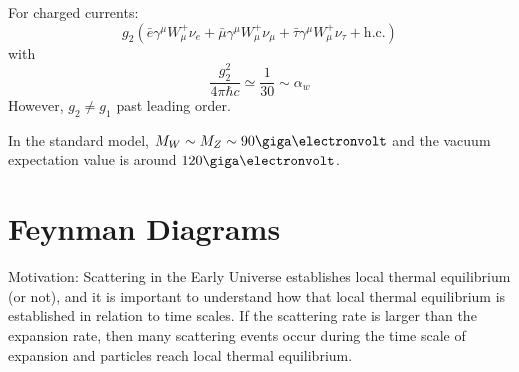 \documentclass[a4paper,twoside,master.tex]{subfiles}
\begin{document}
For charged currents:
\begin{equation}
    g_2 \left( \bar{e} \gamma^{\mu} W_{\mu}^+ \nu_{e} + \bar{\mu} \gamma^{\mu} W_{\mu}^+ \nu_{\mu} + \bar{\tau} \gamma^{\mu} W_{\mu}^+ \nu_{\tau}  + \text{h.c.}\right)
\end{equation}
with
\begin{equation}
    \frac{g_2^2}{4 \pi \hbar c} \simeq \frac{1}{30} \sim \alpha_w
\end{equation}
However, $ g_2 \neq g_1 $ past leading order.

In the standard model, $ M_W \sim M_Z \sim 90\giga\electronvolt $ and the vacuum expectation value is around $ 120\giga\electronvolt $.

\section{Feynman Diagrams}\label{sec:feynman_diagrams}

Motivation: Scattering in the Early Universe establishes local thermal equilibrium (or not), and it is important to understand how that local thermal equilibrium is established in relation to time scales. If the scattering rate is larger than the expansion rate, then many scattering events occur during the time scale of expansion and particles reach local thermal equilibrium.
\end{document}
